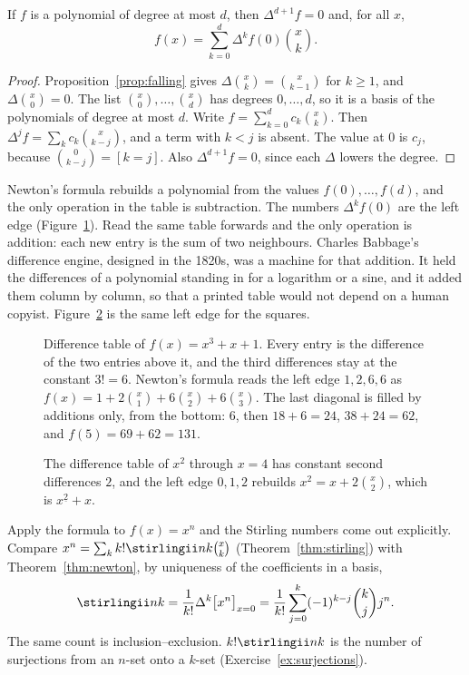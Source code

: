 \begin{theorem}\label{thm:newton}
If $f$ is a polynomial of degree at most $d$, then $\Delta^{d+1}f=0$ and, for all $x$,
\[
f(x)=\sum_{k=0}^d\Delta^kf(0)\binom xk.
\]
\end{theorem}
\begin{proof}
Proposition~\ref{prop:falling} gives $\Delta\binom xk=\binom x{k-1}$ for $k\ge1$, and $\Delta\binom x0=0$. The list $\binom x0,\dots,\binom xd$ has degrees $0,\dots,d$, so it is a basis of the polynomials of degree at most $d$. Write $f=\sum_{k=0}^dc_k\binom xk$. Then $\Delta^jf=\sum_kc_k\binom x{k-j}$, and a term with $k<j$ is absent. The value at $0$ is $c_j$, because $\binom0{k-j}=[k=j]$. Also $\Delta^{d+1}f=0$, since each $\Delta$ lowers the degree.
\end{proof}

Newton's formula rebuilds a polynomial from the values $f(0),\dots,f(d)$, and the only operation in the table is subtraction. The numbers $\Delta^kf(0)$ are the left edge (Figure~\ref{fig:difftable}). Read the same table forwards and the only operation is addition: each new entry is the sum of two neighbours. Charles Babbage's difference engine, designed in the 1820s, was a machine for that addition. It held the differences of a polynomial standing in for a logarithm or a sine, and it added them column by column, so that a printed table would not depend on a human copyist. Figure~\ref{fig:rw01-edge} is the same left edge for the squares.

\begin{figure}[ht]
\centering
{}
\caption{Difference table of $f(x)=x^3+x+1$. Every entry is the difference of the two entries above it, and the third differences stay at the constant $3!=6$. Newton's formula reads the left edge $1,2,6,6$ as $f(x)=1+2\binom x1+6\binom x2+6\binom x3$. The last diagonal is filled by additions only, from the bottom: $6$, then $18+6=24$, $38+24=62$, and $f(5)=69+62=131$.}
\label{fig:difftable}
\end{figure}

\begin{figure}[ht]
\centering
{}
\caption{The difference table of $x^2$ through $x=4$ has constant second differences $2$, and the left edge $0,1,2$ rebuilds $x^2=x+2\binom{x}{2}$, which is $x^{\underline 2}+x$.}
\label{fig:rw01-edge}
\end{figure}

Apply the formula to $f(x)=x^n$ and the Stirling numbers come out explicitly. Compare
$x^n=\sum_kk!\stirlingii nk\binom xk$ (Theorem~\ref{thm:stirling}) with Theorem~\ref{thm:newton}, by uniqueness of the
coefficients in a basis,
\[
\stirlingii nk=\frac1{k!}\Delta^k\bigl[x^n\bigr]_{x=0}=\frac1{k!}\sum_{j=0}^k(-1)^{k-j}\binom kjj^n.
\]
The same count is inclusion--exclusion. $k!\stirlingii nk$ is the number of surjections from an $n$-set onto a $k$-set (Exercise~\ref{ex:surjections}).


